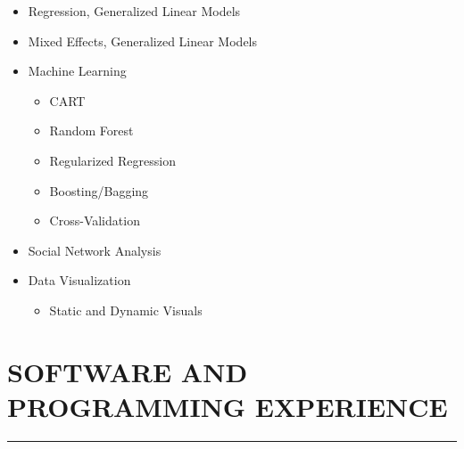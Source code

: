 \documentclass[]{DissertateUSU}
\providecommand{\tightlist}{%
  \setlength{\itemsep}{0pt}\setlength{\parskip}{0pt}}
\begin{document}
\begin{itemize}
\tightlist
\item
  Regression, Generalized Linear Models
\item
  Mixed Effects, Generalized Linear Models
\item
  Machine Learning

  \begin{itemize}
  \tightlist
  \item
    CART
  \item
    Random Forest
  \item
    Regularized Regression
  \item
    Boosting/Bagging
  \item
    Cross-Validation
  \end{itemize}
\item
  Social Network Analysis
\item
  Data Visualization

  \begin{itemize}
  \tightlist
  \item
    Static and Dynamic Visuals
  \end{itemize}
\end{itemize}

\vspace{20pt} \tocless\section{SOFTWARE AND PROGRAMMING EXPERIENCE}
\vspace{-10pt} \hrule
\end{document}
